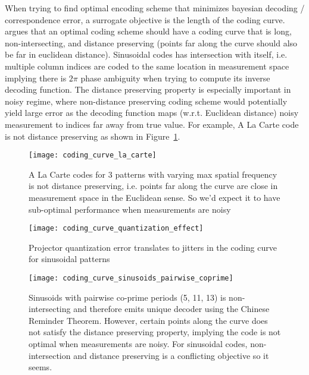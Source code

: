 \documentclass[../writeup.tex]{subfiles}
\begin{document}
When trying to find optimal encoding scheme that minimizes bayesian decoding / correspondence error, a surrogate objective is the length of the coding curve. \cite{guptaGeometricPerspectiveStructured2018} argues that an optimal coding scheme should have a coding curve that is long, non-intersecting, and distance preserving (points far along the curve should also be far in euclidean distance). Sinusoidal codes has intersection with itself, i.e. multiple column indices are coded to the same location in measurement space implying there is $2\pi$ phase ambiguity when trying to compute its inverse decoding function. The distance preserving property is especially important in noisy regime, where non-distance preserving coding scheme would potentially yield large error as the decoding function maps (w.r.t. Euclidean distance) noisy measurement to indices far away from true value. For example, A La Carte code is not distance preserving as shown in Figure~\ref{fig:coding_curve_la_carte}. 
\begin{figure}[h!] 
    \begin{center}
        \texttt{[image: coding\_curve\_la\_carte]}
        \caption{A La Carte codes for $3$ patterns with varying max spatial frequency \cite{mirdehghanOptimalStructuredLight2018} is not distance preserving, i.e. points far along the curve are close in measurement space in the Euclidean sense. So we'd expect it to have sub-optimal performance when measurements are noisy}
        \label{fig:coding_curve_la_carte}
    \end{center}
\end{figure}
\begin{figure}[h!]
    \begin{center}
        \texttt{[image: coding\_curve\_quantization\_effect]}
        \caption{Projector quantization error translates to jitters in the coding curve for sinusoidal patterns}
        \label{fig:coding_curve_quantization_effect}
    \end{center}
\end{figure}
\begin{figure}[h!]
    \begin{center}
        \texttt{[image: coding\_curve\_sinusoids\_pairwise\_coprime]}
        \caption{Sinusoids with pairwise co-prime periods (5, 11, 13) is non-intersecting and therefore emits unique decoder using the Chinese Reminder Theorem. However, certain points along the curve does not satisfy the distance preserving property, implying the code is not optimal when measurements are noisy. For sinusoidal codes, non-intersection and distance preserving is a conflicting objective so it seems.}
        \label{fig:coding_curve_sinusoids_pairwise_coprime}
    \end{center}
\end{figure}
\end{document}
